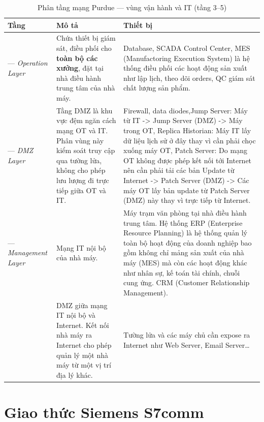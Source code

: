 \documentclass[../main.tex]{subfiles}
\begin{document}
\begin{table}[H]
    \centering
    \caption{Phân tầng mạng Purdue --- vùng vận hành và IT (tầng 3--5)}
    \label{tab:purdue-layers-it}
    \footnotesize
    \renewcommand{\arraystretch}{1.25}
    \begin{tabular}{|>{\raggedright\arraybackslash}p{2.1cm}|>{\raggedright\arraybackslash}p{4.3cm}|>{\raggedright\arraybackslash}p{7.2cm}|}
        \hline
        \textbf{Tầng} & \textbf{Mô tả} & \textbf{Thiết bị} \\
        \hline
        3 --- \textit{Operation Layer} &
        Chứa thiết bị giám sát, điều phối cho \textbf{toàn bộ các xưởng}, đặt tại nhà điều hành trung tâm của nhà máy. &
        Database, SCADA Control Center, MES (Manufactoring Execution System) là hệ thống điều phối các hoạt động sản xuất như lập lịch, theo dõi orders, QC giám sát chất lượng sản phẩm. \\
        \hline
        3.5 --- \textit{DMZ Layer} &
        Tầng DMZ là khu vực đệm ngăn cách mạng OT và IT. Phân vùng này kiểm soát truy cập qua tường lửa, không cho phép lưu lượng đi trực tiếp giữa OT và IT. &
        Firewall, data diodes,Jump Server: Máy từ IT -> Jump Server (DMZ) -> Máy trong OT, Replica Historian: Máy IT lấy dữ liệu lịch sử ở đây thay vì cần phải chọc xuống máy OT, Patch Server: Do mạng OT không được phép kết nối tới Internet nên cần phải tải các bản Update từ Internet -> Patch Server (DMZ) -> Các máy OT lấy bản update từ Patch Server (DMZ) này thay vì trực tiếp từ Internet. \\
        \hline
        4 --- \textit{Management Layer} &
        Mạng IT nội bộ của nhà máy. &
        Máy trạm văn phòng tại nhà điều hành trung tâm. Hệ thống ERP (Enterprise Resource Planning) là hệ thống quản lý toàn bộ hoạt động của doanh nghiệp bao gồm không chỉ mảng sản xuất của nhà máy (MES) mà còn các hoạt động khác như nhân sự, kế toán tài chính, chuỗi cung ứng. CRM (Customer Relationship Management). \\
        \hline
        5 &
        DMZ giữa mạng IT nội bộ và Internet. Kết nối nhà máy ra Internet cho phép quản lý một nhà máy từ một vị trí địa lý khác. &
        Tường lửa và các máy chủ cần expose ra Internet như Web Server, Email Server\ldots \\
        \hline
    \end{tabular}
\end{table}

\section{Giao thức Siemens S7comm}
\label{sec:s7comm}
\end{document}
